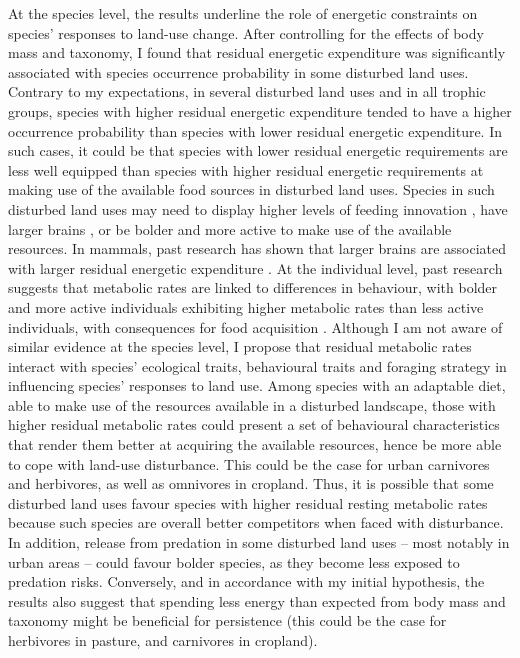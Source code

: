 At the species level, the results underline the role of energetic constraints on species' responses to land-use change. After controlling for the effects of body mass and taxonomy, I found that residual energetic expenditure was significantly associated with species occurrence probability in some disturbed land uses. Contrary to my expectations, in several disturbed land uses and in all trophic groups, species with higher residual energetic expenditure tended to have a higher occurrence probability than species with lower residual energetic expenditure. In such cases, it could be that species with lower residual energetic requirements are less well equipped than species with higher residual energetic requirements at making use of the available food sources in disturbed land uses. Species in such disturbed land uses may need to display higher levels of feeding innovation \citep{Coogan2018}, have larger brains \citep{Sayol2020}, or be bolder and more active to make use of the available resources. In mammals, past research has shown that larger brains are associated with larger residual energetic expenditure \citep{Isler2006}. At the individual level, past research suggests that metabolic rates are linked to differences in behaviour, with bolder and more active individuals exhibiting higher metabolic rates than less active individuals, with consequences for food acquisition \citep{Biro2010}. Although I am not aware of similar evidence at the species level, I propose that residual metabolic rates interact with species' ecological traits, behavioural traits and foraging strategy in influencing species' responses to land use. Among species with an adaptable diet, able to make use of the resources available in a disturbed landscape, those with higher residual metabolic rates could present a set of behavioural characteristics that render them better at acquiring the available resources, hence be more able to cope with land-use disturbance. This could be the case for urban carnivores and herbivores, as well as omnivores in cropland. Thus, it is possible that some disturbed land uses favour species with higher residual resting metabolic rates because such species are overall better competitors when faced with disturbance. In addition, release from predation in some disturbed land uses – most notably in urban areas – could favour bolder species, as they become less exposed to predation risks.
Conversely, and in accordance with my initial hypothesis, the results also suggest that spending less energy than expected from body mass and taxonomy might be beneficial for persistence (this could be the case for herbivores in pasture, and carnivores in cropland).

